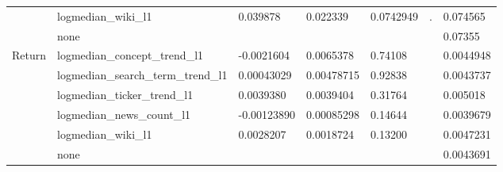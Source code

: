 \begin{table}[!htbp]
\begin{tabular}{lllllll}
                            & logmedian\_wiki\_l1                & 0.039878             & 0.022339           & 0.0742949        & .                     & 0.074565                      \\
                            & none                               &                      &                    &                  &                       & 0.07355                       \\
\multirow{6}{*}{Return}     & logmedian\_concept\_trend\_l1      & -0.0021604           & 0.0065378          & 0.74108          &                       & 0.0044948                     \\
                            & logmedian\_search\_term\_trend\_l1 & 0.00043029           & 0.00478715         & 0.92838          &                       & 0.0043737                     \\
                            & logmedian\_ticker\_trend\_l1       & 0.0039380            & 0.0039404          & 0.31764          &                       & 0.005018                      \\
                            & logmedian\_news\_count\_l1         & -0.00123890          & 0.00085298         & 0.14644          &                       & 0.0039679                     \\
                            & logmedian\_wiki\_l1                & 0.0028207            & 0.0018724          & 0.13200          &                       & 0.0047231                     \\
                            & none                               &                      &                    &                  &                       & 0.0043691                    
\end{tabular}
\end{table}